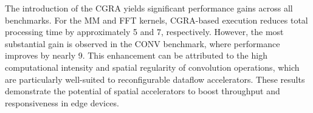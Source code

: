             The introduction of the CGRA yields significant performance gains across all benchmarks. For the MM and FFT kernels, CGRA-based execution reduces total processing time by approximately \SI{5}{\times} and \SI{7}{\times}, respectively. However, the most substantial gain is observed in the CONV benchmark, where performance improves by nearly \SI{9}{\times}. This enhancement can be attributed to the high computational intensity and spatial regularity of convolution operations, which are particularly well-suited to reconfigurable dataflow accelerators. These results demonstrate the potential of spatial accelerators to boost throughput and responsiveness in edge devices.

            \begin{table}[tp]
                \caption{Normalized processing time (in cycles) and power consumption (in \si{\milli\watt}) across platforms and processing elements for representative workloads.}
                \label{tbl:processing}
                \centering
            \end{table}
            
